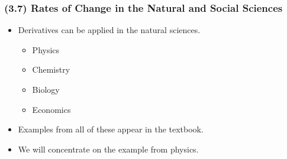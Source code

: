 \begin{frame}
\frametitle{(3.7)  Rates of Change in the Natural and Social Sciences}
\begin{itemize}
\item  Derivatives can be applied in the natural sciences.
\begin{itemize}
\item  Physics
\item  Chemistry
\item  Biology
\item  Economics
\end{itemize}
\item  Examples from all of these appear in the textbook.
\item  We will concentrate on the example from physics.
\end{itemize}
\end{frame}
